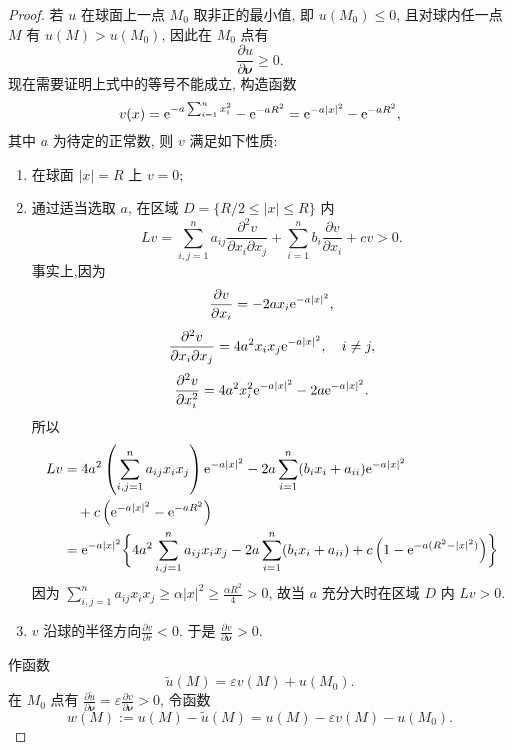 \begin{proof}
  若 $u$ 在球面上一点 $M_0$ 取非正的最小值, 即 $u(M_0)\leq 0$,
  且对球内任一点 $M$ 有 $u(M)>u(M_0)$, 因此在 $M_0$ 点有
  \[\frac{\partial u}{\partial\bm{\nu}}\geq 0.\]
  现在需要证明上式中的等号不能成立, 构造函数
  \[v(x) = \mathrm{e}^{-a\sum_{i=1}^nx_i^2} - \mathrm{e}^{-aR^2} = \mathrm{e}^{-a|x|^2} - \mathrm{e}^{-aR^2},\]
  其中 $a$ 为待定的正常数, 则 $v$ 满足如下性质:
  \begin{enumerate}[(1)]
    \item 在球面 $|x|=R$ 上 $v=0$;
    \item 通过适当选取 $a$, 在区域 $D=\{ R/2 \leq |x| \leq R\}$ 内
      \[Lv = \sum_{i,j=1}^na_{ij}\frac{\partial^2v}{\partial x_i\partial x_j}
        + \sum_{i=1}^nb_i\frac{\partial v}{\partial x_i}+cv > 0.\]
      事实上,因为
      \[\frac{\partial v}{\partial x_i} = -2a x_i \mathrm{e}^{-a|x|^2},\]
      \[\frac{\partial^2v}{\partial x_i\partial x_j} = 4a^2 x_i x_j 
        \mathrm{e}^{-a|x|^2},\quad i\neq j,\]
      \[\frac{\partial^2v}{\partial x_i^2} = 4a^2 x_i^2 \mathrm{e}^{-a|x|^2}
        -2a \mathrm{e}^{-a|x|^2}.\]
      所以
      \begin{align*}
      Lv
      & = 4a^2\left(\sum_{i,j=1}^na_{ij}x_ix_j\right) \mathrm{e}^{-a|x|^2}
        - 2a \sum_{i=1}^n (b_ix_i + a_{ii}) \mathrm{e}^{-a|x|^2} \\
      & \quad + c \left(\mathrm{e}^{-a|x|^2} - \mathrm{e}^{-aR^2}\right) \\
      & = \mathrm{e}^{-a|x|^2} \biggl\{ 4a^2\sum_{i,j=1}^n a_{ij} x_i x_j
        - 2a\sum_{i=1}^n (b_i x_i + a_{ii}) + c \left(1 - \mathrm{e}^{-a(R^2-|x|^2)}\right)\biggr\}
      \end{align*}
      因为 $\sum_{i,j=1}^n a_{ij} x_i x_j \geq \alpha |x|^2 \geq \frac{\alpha R^2}{4} > 0$,
      故当 $a$ 充分大时在区域 $D$ 内 $Lv > 0$.
    \item $v$ 沿球的半径方向$\frac{\partial v}{\partial r}<0$.
        于是 $\frac{\partial v}{\partial\bm{\nu}} > 0$.
  \end{enumerate}

  作函数
  \[\tilde{u}(M)=\varepsilon v(M)+u(M_0).\]
  在 $M_0$ 点有 $\frac{\partial\tilde{u}}{\partial\bm{\nu}}
  = \varepsilon\frac{\partial v}{\partial\bm{\nu}}>0$,
  令函数
  \[w(M) := u(M)-\tilde{u}(M) = u(M)-\varepsilon v(M)-u(M_0).\]
  

\end{proof}
